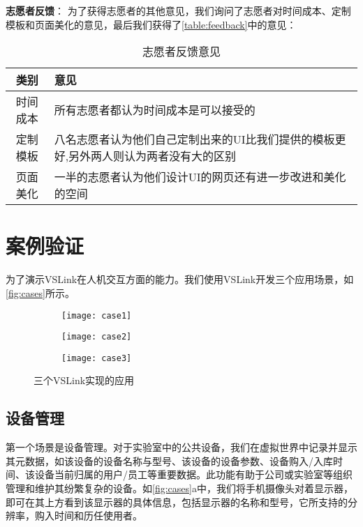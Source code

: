\textbf{志愿者反馈}：
为了获得志愿者的其他意见，我们询问了志愿者对时间成本、定制模板和页面美化的意见，最后我们获得了\autoref{table:feedback}中的意见：
\begin{table}[htbp]
    \caption{志愿者反馈意见}
	\label{table:feedback}
    \begin{tabularx}{\linewidth}{|c|X|}
        \hline
        类别 & 意见 \\ \hline
        时间成本 & 所有志愿者都认为时间成本是可以接受的 \\ \hline
        定制模板 & 八名志愿者认为他们自己定制出来的UI比我们提供的模板更好,另外两人则认为两者没有大的区别 \\ \hline
        页面美化 & 一半的志愿者认为他们设计UI的网页还有进一步改进和美化的空间 \\ \hline
    \end{tabularx}
\end{table}


\section{案例验证}
为了演示VSLink在人机交互方面的能力。我们使用VSLink开发三个应用场景，如\autoref{fig:cases}所示。

\begin{figure}[htbp]
	\centering
	\begin{subfigure}{.65\linewidth}
		\texttt{[image: case1]}
		\caption{}
	\end{subfigure}
	\begin{subfigure}{.65\linewidth}
		\texttt{[image: case2]}
		\caption{}
	\end{subfigure}
	\begin{subfigure}{.65\linewidth}
		\texttt{[image: case3]}
		\caption{}
	\end{subfigure}
	\caption{三个VSLink实现的应用}\label{fig:cases}
\end{figure}

\subsection{设备管理}
第一个场景是设备管理。对于实验室中的公共设备，我们在虚拟世界中记录并显示其元数据，如该设备的设备名称与型号、该设备的设备参数、设备购入/入库时间、该设备当前归属的用户/员工等重要数据。此功能有助于公司或实验室等组织管理和维护其纷繁复杂的设备。如\autoref{fig:cases}a中，我们将手机摄像头对着显示器，即可在其上方看到该显示器的具体信息，包括显示器的名称和型号，它所支持的分辨率，购入时间和历任使用者。

